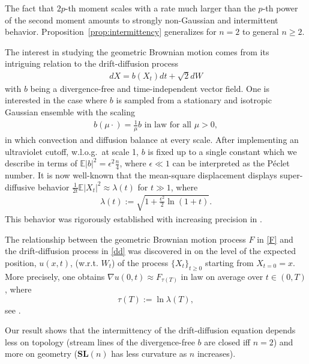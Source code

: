 \documentclass[english, letterpaper,12pt,reqno]{amsart}
\theoremstyle{remark}
\theoremstyle{plain}
\newcommand{\1}{\mathbf{1}}
\def\bbE{\mathbb E}
\begin{document}
\medskip \noindent
The fact that $2p$-th moment scales with a rate much larger than the $p$-th power of the second moment amounts to strongly non-Gaussian and intermittent behavior. Proposition~\ref{prop:intermittency} generalizes \cite[Lemma 2]{MOW25} for $n=2$ to general $n\ge 2$.

\medskip \noindent
The interest in studying the geometric Brownian motion comes from its
intriguing relation to the drift-diffusion process 
%
\begin{align}
    dX=b(X_t)dt+\sqrt{2}dW \label{dd}
\end{align}
%
with $b$ being a divergence-free and time-independent vector field. One is interested in the case where $b$ is sampled from a stationary and isotropic Gaussian ensemble with the scaling 
%
 \begin{align}
   \label{b} b(\mu \cdot)=\frac{1}{\mu}b \text{ in law for all } \mu>0,
\end{align}
%
in which convection and diffusion balance at every scale. After implementing an ultraviolet cutoff, w.l.o.g.\ at scale 1, $b$ is fixed up to a single constant which we describe in terms of $\mathbb{E}|b|^2=\epsilon^2 \frac{ n }{ 4 } $, where $\epsilon \ll 1$ can be interpreted as the P\'{e}clet number. It is now well-known that the mean-square displacement displays super-diffusive behavior $\frac{1}{2t}\bbE|X_t|^2 \approx \lambda(t)$ for $t \gg 1$, where 
%
\begin{align*}
\lambda(t):=\sqrt{1+\frac{\epsilon^2}{2} \ln(1+t)}.
\end{align*}
%
This behavior was rigorously established with increasing precision in \cite{TV12, CHT22, CMOW22,ABK24, MOW25}. 

\medskip \noindent
The relationship between the geometric Brownian motion process $F$ in \eqref{F} and the drift-diffusion process in \eqref{dd} was discovered in \cite{MOW25} on the level of the expected position, $u(x,t)$, (w.r.t. $W_t$) of the process $\{X_t\}_{t\geq 0}$ starting from $X_{t=0}=x$. More precisely, one obtains $\nabla u(0,t) \approx F_{\tau(T)}$ in law on average over $t\in (0,T)$, where $$\tau(T):=\ln \lambda(T), $$ see \cite[Theorem 2 \& (19)]{MOW25}.


\medskip \noindent
Our result shows that the intermittency of the drift-diffusion equation depends less on topology (stream lines of the divergence-free $b$ are closed iff $n=2$) and more on geometry ($\textbf{SL}(n)$ has less curvature as $n$ increases). 
\end{document}
